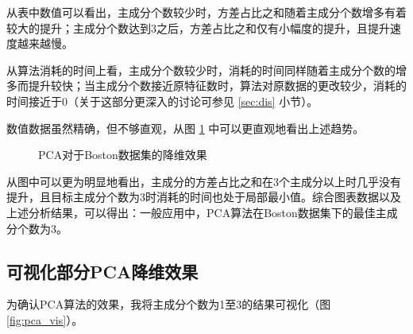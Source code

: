 \documentclass[12pt,a4paper]{article}
\theoremstyle{definition}
\begin{document}
从表中数值可以看出，主成分个数较少时，方差占比之和随着主成分个数增多有着较大的提升；主成分个数达到3之后，方差占比之和仅有小幅度的提升，且提升速度越来越慢。

从算法消耗的时间上看，主成分个数较少时，消耗的时间同样随着主成分个数的增多而提升较快；当主成分个数接近原特征数时，算法对原数据的更改较少，消耗的时间接近于0（关于这部分更深入的讨论可参见 \ref{sec:dis} 小节）。

数值数据虽然精确，但不够直观，从图 \ref{fig::kline} 中可以更直观地看出上述趋势。

\begin{figure}[H]
	\centering
	\caption{PCA对于Boston数据集的降维效果}
	\label{fig::kline}
\end{figure}

从图中可以更为明显地看出，主成分的方差占比之和在3个主成分以上时几乎没有提升，且目标主成分个数为3时消耗的时间也处于局部最小值。综合图表数据以及上述分析结果，可以得出：一般应用中，PCA算法在Boston数据集下的最佳主成分个数为3。

\subsection{可视化部分PCA降维效果}

为确认PCA算法的效果，我将主成分个数为1至3的结果可视化（图 \ref{fig:pca_vis}）。
\end{document}
